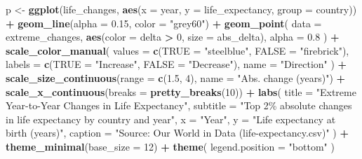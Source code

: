 \documentclass[
  11pt,
]{article}
\newenvironment{Shaded}{\begin{snugshade}}{\end{snugshade}}
\newcommand{\AttributeTok}[1]{\textcolor[rgb]{0.13,0.29,0.53}{#1}}
\newcommand{\DecValTok}[1]{\textcolor[rgb]{0.00,0.00,0.81}{#1}}
\newcommand{\FloatTok}[1]{\textcolor[rgb]{0.00,0.00,0.81}{#1}}
\newcommand{\FunctionTok}[1]{\textcolor[rgb]{0.13,0.29,0.53}{\textbf{#1}}}
\newcommand{\NormalTok}[1]{#1}
\newcommand{\OtherTok}[1]{\textcolor[rgb]{0.56,0.35,0.01}{#1}}
\newcommand{\SpecialCharTok}[1]{\textcolor[rgb]{0.81,0.36,0.00}{\textbf{#1}}}
\newcommand{\StringTok}[1]{\textcolor[rgb]{0.31,0.60,0.02}{#1}}
\begin{document}
\begin{Shaded}
\begin{Highlighting}[]
\NormalTok{p }\OtherTok{\textless{}{-}} \FunctionTok{ggplot}\NormalTok{(life\_changes, }\FunctionTok{aes}\NormalTok{(}\AttributeTok{x =}\NormalTok{ year, }\AttributeTok{y =}\NormalTok{ life\_expectancy, }\AttributeTok{group =}\NormalTok{ country)) }\SpecialCharTok{+}
  \FunctionTok{geom\_line}\NormalTok{(}\AttributeTok{alpha =} \FloatTok{0.15}\NormalTok{, }\AttributeTok{color =} \StringTok{"grey60"}\NormalTok{) }\SpecialCharTok{+}
  \FunctionTok{geom\_point}\NormalTok{(}
    \AttributeTok{data =}\NormalTok{ extreme\_changes,}
    \FunctionTok{aes}\NormalTok{(}\AttributeTok{color =}\NormalTok{ delta }\SpecialCharTok{\textgreater{}} \DecValTok{0}\NormalTok{, }\AttributeTok{size =}\NormalTok{ abs\_delta),}
    \AttributeTok{alpha =} \FloatTok{0.8}
\NormalTok{  ) }\SpecialCharTok{+}
  \FunctionTok{scale\_color\_manual}\NormalTok{(}
    \AttributeTok{values =} \FunctionTok{c}\NormalTok{(}\StringTok{\textasciigrave{}}\AttributeTok{TRUE}\StringTok{\textasciigrave{}} \OtherTok{=} \StringTok{"steelblue"}\NormalTok{, }\StringTok{\textasciigrave{}}\AttributeTok{FALSE}\StringTok{\textasciigrave{}} \OtherTok{=} \StringTok{"firebrick"}\NormalTok{),}
    \AttributeTok{labels =} \FunctionTok{c}\NormalTok{(}\StringTok{\textasciigrave{}}\AttributeTok{TRUE}\StringTok{\textasciigrave{}} \OtherTok{=} \StringTok{"Increase"}\NormalTok{, }\StringTok{\textasciigrave{}}\AttributeTok{FALSE}\StringTok{\textasciigrave{}} \OtherTok{=} \StringTok{"Decrease"}\NormalTok{),}
    \AttributeTok{name =} \StringTok{"Direction"}
\NormalTok{  ) }\SpecialCharTok{+}
  \FunctionTok{scale\_size\_continuous}\NormalTok{(}\AttributeTok{range =} \FunctionTok{c}\NormalTok{(}\FloatTok{1.5}\NormalTok{, }\DecValTok{4}\NormalTok{), }\AttributeTok{name =} \StringTok{"Abs. change (years)"}\NormalTok{) }\SpecialCharTok{+}
  \FunctionTok{scale\_x\_continuous}\NormalTok{(}\AttributeTok{breaks =} \FunctionTok{pretty\_breaks}\NormalTok{(}\DecValTok{10}\NormalTok{)) }\SpecialCharTok{+}
  \FunctionTok{labs}\NormalTok{(}
    \AttributeTok{title =} \StringTok{"Extreme Year{-}to{-}Year Changes in Life Expectancy"}\NormalTok{,}
    \AttributeTok{subtitle =} \StringTok{"Top 2\% absolute changes in life expectancy by country and year"}\NormalTok{,}
    \AttributeTok{x =} \StringTok{"Year"}\NormalTok{,}
    \AttributeTok{y =} \StringTok{"Life expectancy at birth (years)"}\NormalTok{,}
    \AttributeTok{caption =} \StringTok{"Source: Our World in Data (life{-}expectancy.csv)"}
\NormalTok{  ) }\SpecialCharTok{+}
  \FunctionTok{theme\_minimal}\NormalTok{(}\AttributeTok{base\_size =} \DecValTok{12}\NormalTok{) }\SpecialCharTok{+}
  \FunctionTok{theme}\NormalTok{(}
    \AttributeTok{legend.position =} \StringTok{"bottom"}
\NormalTok{  )}
\end{Highlighting}
\end{Shaded}
\end{document}

